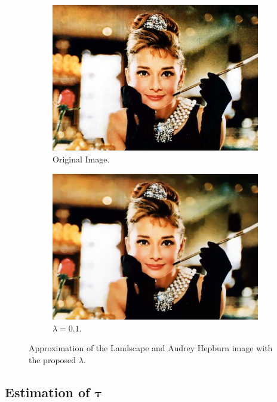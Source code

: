 \documentclass[abstracton]{scrreprt}
\begin{document}
\begin{figure}[!ht]
\begin{subfigure}[b]{0.4\textwidth}
                    \includegraphics[width=\textwidth]{img/images/hepburn.png}
                    \caption{Original Image.}
                \end{subfigure}
                \begin{subfigure}[b]{0.4\textwidth}
                    \includegraphics[width=\textwidth]{img/approximation/01hepburn.png}
                    \caption{$\lambda = 0.1$.}
                \end{subfigure}
                \caption[First estimate of $\lambda$ for the ROF model.]{Approximation of the Landscape and Audrey Hepburn image with the proposed $\lambda$.}
            \label{fig:estimation_of_lambda_rof}
            \end{figure}

        \subsection{Estimation of $\boldsymbol{\tau}$}
        \label{sub:estimation_of_tau_rof}
\end{document}
